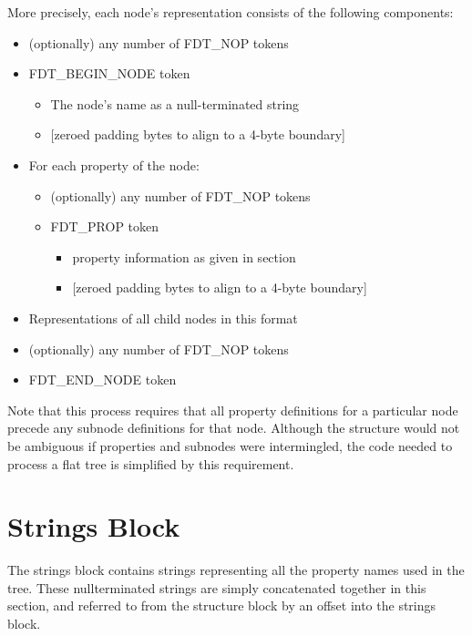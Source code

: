 \documentclass[a4paper,10pt,oneside]{sphinxmanual}
\begin{document}
More precisely, each node’s representation consists of the following
components:
\begin{itemize}
\item {} 
(optionally) any number of FDT\_NOP tokens

\item {} 
FDT\_BEGIN\_NODE token
\begin{itemize}
\item {} 
The node’s name as a null-terminated string

\item {} 
{[}zeroed padding bytes to align to a 4-byte boundary{]}

\end{itemize}

\item {} 
For each property of the node:
\begin{itemize}
\item {} 
(optionally) any number of FDT\_NOP tokens

\item {} 
FDT\_PROP token
\begin{itemize}
\item {} 
property information as given in section {\hyperref[flattened\string-format:sect\string-fdt\string-lexical\string-structure]{}}

\item {} 
{[}zeroed padding bytes to align to a 4-byte boundary{]}

\end{itemize}

\end{itemize}

\item {} 
Representations of all child nodes in this format

\item {} 
(optionally) any number of FDT\_NOP tokens

\item {} 
FDT\_END\_NODE token

\end{itemize}

Note that this process requires that all property definitions for a
particular node precede any subnode definitions for that node. Although
the structure would not be ambiguous if properties and subnodes were
intermingled, the code needed to process a flat tree is simplified by
this requirement.


\section{Strings Block}
\label{flattened-format:strings-block}\label{flattened-format:sect-fdt-strings-block}
The strings block contains strings representing all the property names
used in the tree. These nullterminated strings are simply concatenated
together in this section, and referred to from the structure block by an
offset into the strings block.
\end{document}
